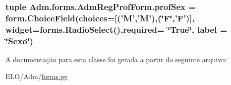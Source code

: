 \hypertarget{classAdm_1_1forms_1_1AdmRegProfForm_ab910e0448e7d6dac759c1cdcb24a4314}{
\subsubsection[{prof\-Sex}]{\setlength{\rightskip}{0pt plus 5cm}tuple Adm.\-forms.\-Adm\-Reg\-Prof\-Form.\-prof\-Sex = form.\-Choice\-Field(choices=\mbox{[}('M','M'),(\char`\"{}F\char`\"{},'F')\mbox{]}, widget=forms.\-Radio\-Select(),required= \char`\"{}True\char`\"{}, label = \char`\"{}Sexo\char`\"{})\hspace{0.3cm}{\ttfamily [static]}}}\label{classAdm_1_1forms_1_1AdmRegProfForm_ab910e0448e7d6dac759c1cdcb24a4314}


A documentação para esta classe foi gerada a partir do seguinte arquivo\-:\begin{DoxyCompactItemize}
\item 
E\-L\-O/\-Adm/\hyperlink{Adm_2forms_8py}{forms.\-py}\end{DoxyCompactItemize}
